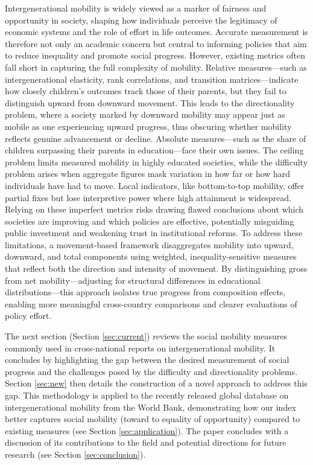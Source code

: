 Intergenerational mobility is widely viewed as a marker of fairness and opportunity in society, shaping how individuals perceive the legitimacy of economic systems and the role of effort in life outcomes. Accurate measurement is therefore not only an academic concern but central to informing policies that aim to reduce inequality and promote social progress. However, existing metrics often fall short in capturing the full complexity of mobility. Relative measures---such as intergenerational elasticity, rank correlations, and transition matrices---indicate how closely children's outcomes track those of their parents, but they fail to distinguish upward from downward movement. This leads to the directionality problem, where a society marked by downward mobility may appear just as mobile as one experiencing upward progress, thus obscuring whether mobility reflects genuine advancement or decline. Absolute measures---such as the share of children surpassing their parents in education---face their own issues. The ceiling problem limits measured mobility in highly educated societies, while the difficulty problem arises when aggregate figures mask variation in how far or how hard individuals have had to move. Local indicators, like bottom-to-top mobility, offer partial fixes but lose interpretive power where high attainment is widespread. Relying on these imperfect metrics risks drawing flawed conclusions about which societies are improving and which policies are effective, potentially misguiding public investment and weakening trust in institutional reforms. To address these limitations, a movement-based framework disaggregates mobility into upward, downward, and total components using weighted, inequality-sensitive measures that reflect both the direction and intensity of movement. By distinguishing gross from net mobility---adjusting for structural differences in educational distributions---this approach isolates true progress from composition effects, enabling more meaningful cross-country comparisons and clearer evaluations of policy effort.

The next section (Section \ref{sec:current}) reviews the social mobility measures commonly used in cross-national reports on intergenerational mobility. It concludes by highlighting the gap between the desired measurement of social progress and the challenges posed by the difficulty and directionality problems. Section \ref{sec:new} then details the construction of a novel approach to address this gap. This methodology is applied to the recently released global database on intergenerational mobility from the World Bank, demonstrating how our index better captures social mobility (toward to equality of opportunity) compared to existing measures (see Section \ref{sec:application}). The paper concludes with a discussion of its contributions to the field and potential directions for future research (see Section \ref{sec:conclusion}).

